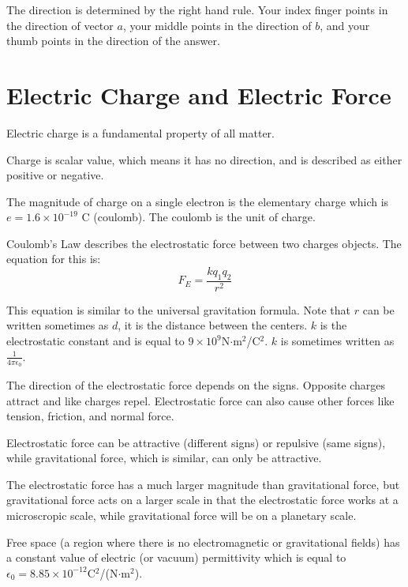 \documentclass[../em.tex]{subfiles}
\begin{document}
The direction is determined by the right hand rule. Your index finger points in the direction of 
vector $a$, your middle points in the direction of $b$, and your thumb points in the direction of the answer.

\section{Electric Charge and Electric Force}
Electric charge is a fundamental property of all matter.

Charge is scalar value, which means it has no direction, and is described as either positive or negative.

The magnitude of charge on a single electron is the elementary charge which is 
$e = 1.6\times 10^{-19}$ C (coulomb). The coulomb is the unit of charge.

Coulomb's Law describes the electrostatic force between two charges objects. The equation for this is:
\[F_E=\frac{kq_1q_2}{r^2}\]

This equation is similar to the universal gravitation formula. Note that 
$r$ can be written sometimes as $d$, it is the distance between the centers. 
$k$ is the electrostatic constant and is equal to $9\times10^9$N$\cdot $m$^2$/C$^2$. $k$ 
is sometimes written as $\frac{1}{4\pi\epsilon_0}$.

The direction of the electrostatic force depends on the signs. 
Opposite charges attract and like charges repel. Electrostatic force can also cause 
other forces like tension, friction, and normal force.

Electrostatic force can be attractive (different signs) or repulsive (same signs), 
while gravitational force, which is similar, can only be attractive. 

The electrostatic force has a much larger magnitude than gravitational force, but 
gravitational force acts on a larger scale in that the electrostatic force works at a 
microscropic scale, while gravitational force will be on a planetary scale.

Free space (a region where there is no electromagnetic or gravitational fields) has a 
constant value of electric (or vacuum) permittivity which is equal to $\epsilon_0 = 8.85\times10^{-12}$C$^2$/(N$\cdot$m$^2$).
\end{document}
